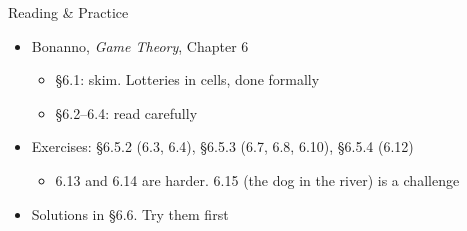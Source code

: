 \begin{frame}{Reading \& Practice}
\begin{itemize}
    \item Bonanno, \textit{Game Theory}, Chapter 6
    \begin{itemize}
        \item \S6.1: skim. Lotteries in cells, done formally
        \item \S6.2--6.4: read carefully
    \end{itemize}
    \item Exercises: \S6.5.2 (6.3, 6.4), \S6.5.3 (6.7, 6.8, 6.10), \S6.5.4 (6.12)
    \begin{itemize}
        \item 6.13 and 6.14 are harder. 6.15 (the dog in the river) is a challenge
    \end{itemize}
    \item Solutions in \S6.6. Try them first
\end{itemize}
\vfill
\end{frame}



